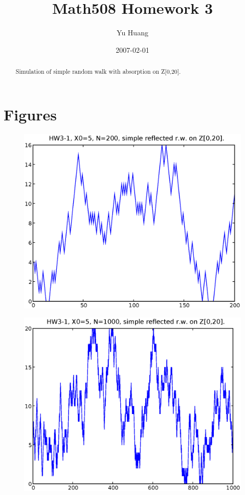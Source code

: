 \documentclass[a4paper,10pt]{article}
\title{Math508 Homework 3}
\author{Yu Huang}
\date{2007-02-01}
\begin{document}
\maketitle

\begin{abstract}
Simulation of simple random walk with absorption on Z[0,20].
\end{abstract}

\section{Figures}
\begin{figure}[h]
\includegraphics[width=1\textwidth]{hw3_1_a_N200_X0_5.eps}
\caption{}
\end{figure}
\begin{figure}[p]
\includegraphics[width=1\textwidth]{hw3_1_a_N1000_X0_5.eps}
\caption{}
\end{figure}
\end{document}
